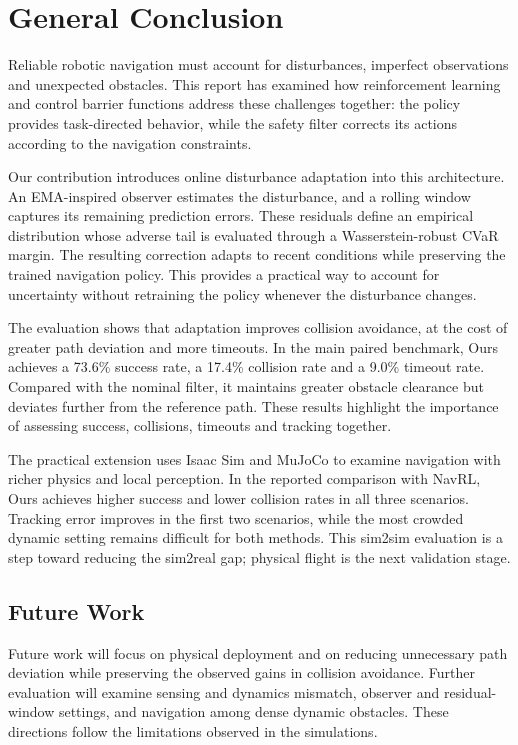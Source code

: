 \begingroup{}\setlength{\parskip}{0pt}
\chapter*{General Conclusion}
{}

Reliable robotic navigation must account for disturbances, imperfect observations and unexpected obstacles. This report has examined how reinforcement learning and control barrier functions address these challenges together: the policy provides task-directed behavior, while the safety filter corrects its actions according to the navigation constraints.

Our contribution introduces online disturbance adaptation into this architecture. An EMA-inspired observer estimates the disturbance, and a rolling window captures its remaining prediction errors. These residuals define an empirical distribution whose adverse tail is evaluated through a Wasserstein-robust CVaR margin. The resulting correction adapts to recent conditions while preserving the trained navigation policy. This provides a practical way to account for uncertainty without retraining the policy whenever the disturbance changes.

The evaluation shows that adaptation improves collision avoidance, at the cost of greater path deviation and more timeouts. In the main paired benchmark, Ours achieves a 73.6\% success rate, a 17.4\% collision rate and a 9.0\% timeout rate. Compared with the nominal filter, it maintains greater obstacle clearance but deviates further from the reference path. These results highlight the importance of assessing success, collisions, timeouts and tracking together.

The practical extension uses Isaac Sim and MuJoCo to examine navigation with richer physics and local perception. In the reported comparison with NavRL, Ours achieves higher success and lower collision rates in all three scenarios. Tracking error improves in the first two scenarios, while the most crowded dynamic setting remains difficult for both methods. This sim2sim evaluation is a step toward reducing the sim2real gap; physical flight is the next validation stage.

\section*{Future Work}
Future work will focus on physical deployment and on reducing unnecessary path deviation while preserving the observed gains in collision avoidance.
Further evaluation will examine sensing and dynamics mismatch, observer and residual-window settings, and navigation among dense dynamic obstacles. These directions follow the limitations observed in the simulations.

\clearpage\endgroup
